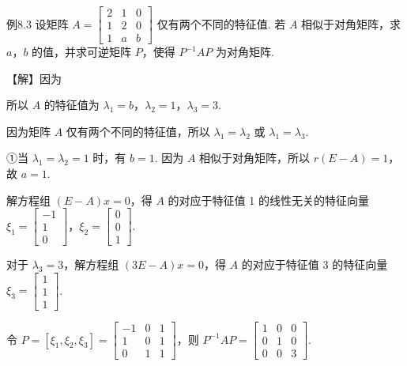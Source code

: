 \begin{fcard}{例8.3}
设矩阵 $A=\begin{bmatrix}2&1&0\\1&2&0\\1&a&b\end{bmatrix}$ 仅有两个不同的特征值. 若 $A$ 相似于对角矩阵，求 $a$，$b$ 的值，并求可逆矩阵 $P$，使得 $P^{-1}AP$ 为对角矩阵.

【解】因为


所以 $A$ 的特征值为 $\lambda_1=b$，$\lambda_2=1$，$\lambda_3=3$.

因为矩阵 $A$ 仅有两个不同的特征值，所以 $\lambda_1=\lambda_2$ 或 $\lambda_1=\lambda_3$.

①当 $\lambda_1=\lambda_2=1$ 时，有 $b=1$. 因为 $A$ 相似于对角矩阵，所以 $r(E-A)=1$，故 $a=1$.

解方程组 $(E-A)x=0$，得 $A$ 的对应于特征值 1 的线性无关的特征向量 $\xi_1=\begin{bmatrix}-1\\1\\0\end{bmatrix}$，$\xi_2=\begin{bmatrix}0\\0\\1\end{bmatrix}$.

对于 $\lambda_3=3$，解方程组 $(3E-A)x=0$，得 $A$ 的对应于特征值 3 的特征向量 $\xi_3=\begin{bmatrix}1\\1\\1\end{bmatrix}$.
\end{fcard}


令 $P=[\xi_1,\xi_2,\xi_3]=\begin{bmatrix}-1&0&1\\1&0&1\\0&1&1\end{bmatrix}$，则 $P^{-1}AP=\begin{bmatrix}1&0&0\\0&1&0\\0&0&3\end{bmatrix}$.

